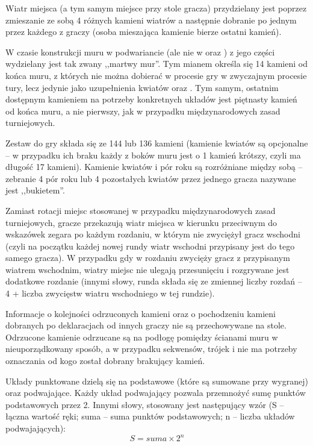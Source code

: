 Wiatr miejsca (a tym samym miejsce przy stole gracza) przydzielany jest poprzez
zmieszanie ze sobą 4 różnych kamieni wiatrów a następnie dobranie po jednym
przez każdego z graczy (osoba mieszająca kamienie bierze ostatni kamień).

\label{cc_mixed_hand}
W czasie konstrukcji muru w podwariancie  (ale nie w
 oraz ) z jego części wydzielany jest
tak zwany ,,martwy mur''. Tym mianem określa się 14 kamieni od końca muru, z
których nie można dobierać w procesie gry w zwyczajnym procesie tury, lecz
jedynie jako uzupełnienia kwiatów oraz . Tym samym, ostatnim
dostępnym kamieniem na potrzeby konkretnych układów jest piętnasty kamień od
końca muru, a nie pierwszy, jak w przypadku międzynarodowych zasad turniejowych.

Zestaw do gry składa się ze 144  lub 136 kamieni (kamienie kwiatów są
opcjonalne -- w przypadku ich braku każdy z boków muru jest o 1 kamień krótszy,
czyli ma długość 17 kamieni). Kamienie kwiatów i pór roku są rozróżniane między
sobą -- zebranie 4 pór roku lub 4 pozostałych kwiatów przez jednego gracza
nazywane jest ,,bukietem''.

Zamiast rotacji miejsc stosowanej w przypadku międzynarodowych zasad
turniejowych, gracze przekazują wiatr miejsca w kierunku przeciwnym do wskazówek
zegara po każdym rozdaniu, w którym nie zwyciężył gracz wschodni (czyli na
początku każdej nowej rundy wiatr wschodni przypisany jest do tego samego
gracza). W przypadku gdy w rozdaniu zwycięży gracz z przypisanym wiatrem
wschodnim, wiatry miejsc nie ulegają przesunięciu i rozgrywane jest dodatkowe
rozdanie (innymi słowy, runda składa się ze zmiennej liczby rozdań -- 4 + liczba
zwycięstw wiatru wschodniego w tej rundzie).

Informacje o kolejności odrzuconych kamieni oraz o pochodzeniu kamieni dobranych
po deklaracjach od innych graczy nie są przechowywane na stole. Odrzucone
kamienie odrzucane są na podłogę pomiędzy ścianami muru w nieuporządkowany
sposób, a w przypadku sekwensów, trójek i  nie ma potrzeby
oznaczania od kogo został dobrany brakujący kamień. 

Układy punktowane dzielą się na podstawowe (które są sumowane przy wygranej)
oraz podwajające. Każdy układ podwajający pozwala przemnożyć sumę punktów
podstawowych przez 2. Innymi słowy, stosowany jest następujący wzór (S -- łączna
wartość ręki; suma -- suma punktów podstawowych; n -- liczba układów
podwajających):
	\begin{equation*}
		S = suma \times 2^n
		\label{zimo}
	\end{equation*}

